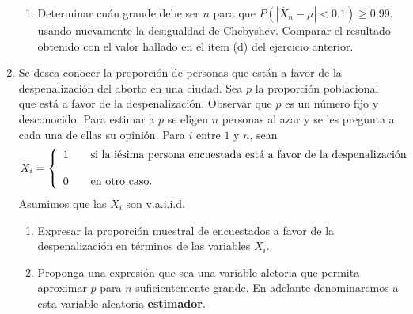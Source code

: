 \documentclass[a4paper, 11pt]{article}
\begin{document}
\begin{enumerate}
\begin{enumerate}
	\item Determinar cu\'an grande debe ser $n$ para que $P\left(  |\overline{X}%
	_{n}-\mu|<0.1\right)  \geq0.99$, usando nuevamente la desigualdad de Chebyshev.
		Comparar el resultado obtenido con el valor hallado en el ítem 
(d) del ejercicio anterior.
	
\end{enumerate}




\item Se desea conocer la proporción de personas que están a favor de
la despenalización del aborto en una ciudad. Sea $p$ la proporción
poblacional que está a favor de la despenalización. Observar que $p$ es
un número fijo y desconocido. Para estimar a $p$ se eligen $n$ personas al
azar y se les pregunta a cada una de ellas su opinión. Para $i$ entre $1$
y $n$, sean%
\[
X_{i}=\left\{
\begin{array}
[c]{lll}%
1 &  & \text{si la iésima persona encuestada está a favor de la
despenalización}\\
&  & \\
0 &  & \text{en otro caso.}%
\end{array}
\right.
\]
Asumimos que las $X_{i}$ son v.a.i.i.d.


\begin{enumerate}
\item Expresar la proporción muestral de encuestados a favor de la
despenalización en términos de las variables $X_{i}.$


\item Proponga una expresión que sea una variable aletoria que permita aproximar $p$ para $n$ suficientemente grande. En adelante denominaremos a esta variable aleatoria \textbf{estimador}.



\end{enumerate}
\end{enumerate}
\end{document}
